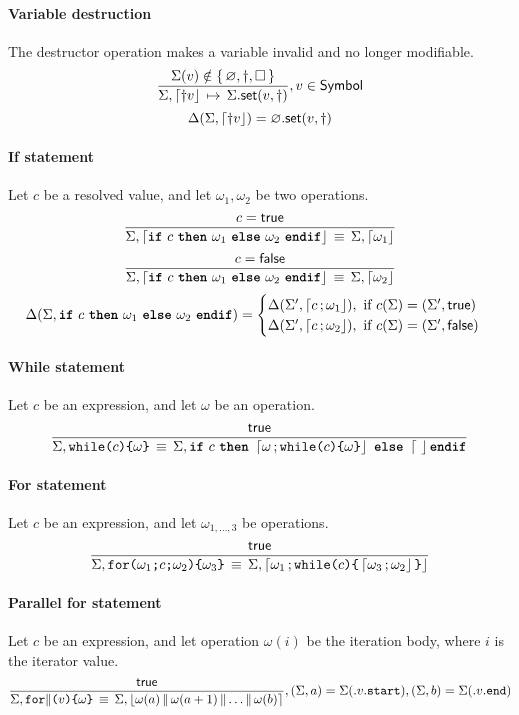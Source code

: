 \paragraph{Variable destruction}
The destructor operation makes a variable invalid and no longer modifiable.
$$
\semrule
	{\Sigma(v) \notin \set{\varnothing, \dagger, \Box}}
	{\Sigma, \stmt{\dagger v}}
	{\StSet{\Sigma}{v}{\dagger}},
		v \in \Symbol
$$
$$
\Delta(\Sigma, \stmt{\dagger v}) = \StSet{\varnothing}{v}{\dagger}
$$


\paragraph{If statement}
Let $c$ be a resolved value, and let $\omega_1, \omega_2$ be two operations.
$$
\semruleeq
	{c = \true}
	{\Sigma, \stmt{\ifstmt{c}{\omega_1}{\omega_2}}}
	{\Sigma, \stmt{\omega_1}}
$$
$$
\semruleeq
	{c = \false}
	{\Sigma, \stmt{\ifstmt{c}{\omega_1}{\omega_2}}}
	{\Sigma, \stmt{\omega_2}}
$$
$$
\Delta(\Sigma, \ifstmt{c}{\omega_1}{\omega_2}) =
\begin{cases}
  \Delta(\Sigma', \stmt{c}{\omega_1}), ~ \text{if } c(\Sigma) = (\Sigma', \true)\\
  \Delta(\Sigma', \stmt{c}{\omega_2}), ~ \text{if } c(\Sigma) = (\Sigma', \false)
\end{cases}
$$

\paragraph{While statement}
Let $c$ be an expression, and let $\omega$ be an operation.
$$
\semruleeq
       {\true}
       {\Sigma, \whilestmt{c}{\omega}}
       {\Sigma, \ifstmt{c}{\stmt{\omega}{\whilestmt{c}{\omega}}}{\stmt}}
$$

\paragraph{For statement}
Let $c$ be an expression, and let $\omega_{1,\ldots,3}$ be operations.
$$
\semruleeq
        {\true}
        {\Sigma, \forstmt{\omega_1}{c}{\omega_2}{\omega_3}}
        {\Sigma, \stmt{\omega_1}{\whilestmt{c}{\stmt{\omega_3}{\omega_2}}}}
$$

\paragraph{Parallel for statement}
Let $c$ be an expression, and let operation $\omega(i)$ be the iteration body, where $i$ is the iterator value.
$$
\semruleeq
        {\true}
        {\Sigma, \parforstmt{v}{\omega}}
        {\Sigma, \parstmt
        	{\omega(a)}
        	{\omega(a+1)}
        	{\ldots}
        	{\omega(b)}},
        (\Sigma, a) = \Sigma(\val{\memb{v}{start}}),
        (\Sigma, b) = \Sigma(\val{\memb{v}{end}})
$$


